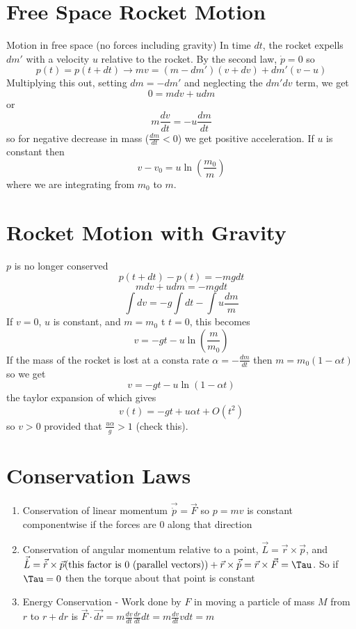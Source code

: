 \documentclass{homework}
\begin{document}
\section{Free Space Rocket Motion}
Motion in free space (no forces including gravity)
In time $dt$, the rocket expells $dm'$ with a velocity $u$ relative to the rocket. By the second law, $\dot p = 0$ so 
\[p(t) = p(t + dt) \rightarrow mv = (m - dm')(v + dv) + dm'(v - u)\]
Multiplying this out, setting $dm = -dm'$ and neglecting the $dm'dv$ term, we get
\[0 = mdv + udm\]
or
\[m\frac{dv}{dt} = -u\frac{dm}{dt}\]
so for negative decrease in mass ($\frac{dm}{dt} <0$) we get positive acceleration. If $u$ is constant then 
\[v - v_0 = u\ln \left( \frac{m_0}{m} \right)\]
where we are integrating from $m_0$ to $m$. 

\section{Rocket Motion with Gravity}
$p$ is no longer conserved
\[p(t + dt) - p(t) = -mgdt\]
\[mdv + udm = -mgdt\]
\[\int dv = -g\int dt - \int u \frac{dm}{m}\]
If $v = 0$, $u$ is constant, and $m = m_0$ t $t = 0$, this becomes 
\[v = -gt -u\ln \left(\frac{m}{m_0} \right) \]
If the mass of the rocket is lost at a consta rate $\alpha = - \frac{dm}{dt}$ then $m = m_0(1 - \alpha t)$ so we get
\[v = -gt -u\ln(1 - \alpha t) \]
the taylor expansion of which gives
\[v(t) = -gt + u\alpha t + O(t^2)\]
so $v > 0$ provided that $\frac{u\alpha}{g} > 1$ (check this).

\section{Conservation Laws}

\begin{enumerate}
    \item {Conservation of linear momentum $\vec{\dot{p}} = \vec{F}$ so $p = mv$ is constant componentwise if the forces are $0$ along that direction}
    \item {Conservation of angular momentum relative to a point, $\vec{L} = \vec{r} \times \vec{p}$, and $\vec{\dot{L}} = \vec{\dot {r}} \times \vec{p} \text{(this factor is $0$ (parallel vectors))} + \vec{r} \times \vec{\dot {p}} = \vec{r} \times \vec{F} = \Tau$. So if $\Tau = 0$ then the torque about that point is constant}
    \item {Energy Conservation - Work done by $F$ in moving a particle of mass $M$ from $r$ to $r + dr$ is $\vec{F} \cdot \vec{dr} = m\frac{dv}{dt}\frac{dr}{dt} dt = m\frac{dv}{dt}vdt = m$}
    
\end{enumerate}
\end{document}
